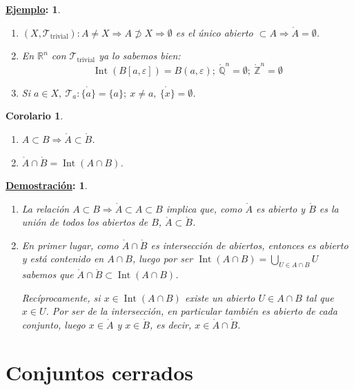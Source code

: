 \documentclass[10pt,a4paper,openright]{book}
\theoremstyle{break}
\newtheorem*{coro}{Corolario}
\newtheorem*{demo}{\underline{Demostración}:}
\newtheorem*{ej}{\underline{Ejemplo}:}
\DeclareMathOperator{\inter}{Int}
\begin{document}
\begin{ej}
\begin{enumerate}
    \item $\left( X, \mathcal{T}_{\text{trivial}} \right): A \neq X \Rightarrow A \not \supset X \Rightarrow \emptyset$ es el único abierto $\subset A \Rightarrow \mathring{A} = \emptyset$.

    \item En $\mathbb{R}^n$ con $\mathcal{T}_{\text{trivial}}$ ya lo sabemos bien:
    \[
    \inter\left( B\left[ a, \varepsilon \right] \right)  = B\left( a, \varepsilon \right);\ \mathring{\mathbb{Q}}^n = \emptyset;\ \mathring{\mathbb{Z}}^n = \emptyset
    \]
    \item Si $a \in X,\ \mathcal{T}_a : \mathring{\{a\}} = \{a\};\ x \neq a,\ \mathring{\{x\}} = \emptyset$.
\end{enumerate}
\end{ej}

\begin{coro}
\begin{enumerate}
    \item $A \subset B \Rightarrow \mathring{A} \subset \mathring{B}$.
    \item $\mathring{A} \cap \mathring{B} = \inter \left( A \cap B \right)$.
\end{enumerate}
\end{coro}
\begin{demo}
\begin{enumerate}
    \item La relación $A \subset B \Rightarrow \mathring{A} \subset A \subset B$ implica que, como $\mathring{A}$ es abierto y $\mathring{B}$ es la unión de todos los abiertos de $B$, $\mathring{A} \subset \mathring{B}$.
    \item En primer lugar, como $\mathring{A}\cap \mathring{B}$ es intersección de abiertos, entonces es abierto y está contenido en $A\cap B$, luego por ser $\inter(A\cap B) = \bigcup_{U\in A\cap B}U$ sabemos que $\mathring{A}\cap \mathring{B} \subset \inter(A\cap B)$.
    
	Recíprocamente, si $x\in \inter(A\cap B)$ existe un abierto $U \in A\cap B$ tal que $x\in U$. Por ser de la intersección, en particular también es abierto de cada conjunto, luego $x\in \mathring{A}$ y $x\in \mathring{B}$, es decir, $x\in \mathring{A}\cap \mathring{B}$.
\end{enumerate}
\end{demo}

\section{Conjuntos cerrados}%
\label{sec:conjuntos_cerrados}
\end{document}
